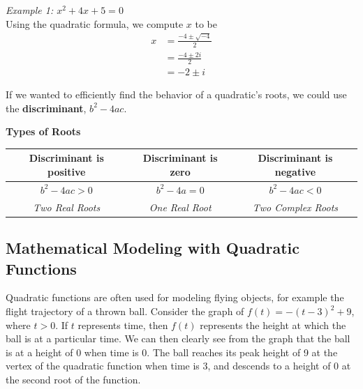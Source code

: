         \noindent \color{blue} \textit{Example 1: $x^2+4x+5=0$} \color{black} \\
        Using the quadratic formula, we compute $x$ to be \\

        \begin{align*}
            x &= \frac{-4\pm\sqrt{-4}}{2} \\
            &= \frac{-4\pm 2i}{2} \\
            &= -2 \pm i
        \end{align*}

        \noindent If we wanted to efficiently find the behavior of a quadratic's roots, we could use the
        \textbf{discriminant}, $b^2-4ac$. \\

        \begin{center}
            \color{purple} \textbf{Types of Roots} \color{black} \\
            \begin{tabular}{|c|c|c|}
                \hline
                Discriminant is positive & Discriminant is zero   & Discriminant is negative   \\
                \hline
                $b^2-4ac>0$              & $b^2-4a=0$             & $b^2-4ac<0$                \\
                \hline
                \textit{Two Real Roots}  & \textit{One Real Root} & \textit{Two Complex Roots} \\
                \hline
            \end{tabular}
        \end{center}



    \subsection{Mathematical Modeling with Quadratic Functions}

        Quadratic functions are often used for modeling flying objects, for example the flight trajectory of a thrown
        ball. Consider the graph of $f(t) = -(t-3)^2+9$, where $t>0$. If $t$ represents time, then
        $f(t)$ represents the height at which the ball is at a particular time. We can then clearly
        see from the graph that the ball is at a height of 0 when time is 0. The ball reaches its peak
        height of 9 at the vertex of the quadratic function when time is 3, and descends to a height of
        0 at the second root of the function.

